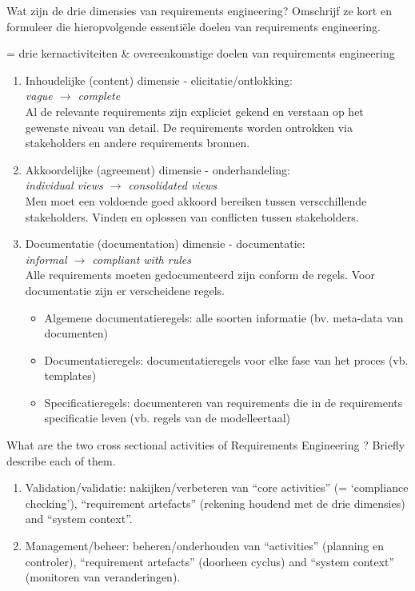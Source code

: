 \documentclass{article}
\begin{document}
\begin{quest}{}Wat zijn de drie dimensies van requirements engineering? Omschrijf ze kort en formuleer die hieropvolgende essenti\"ele doelen van requirements engineering.
\end{quest}
= drie kernactiviteiten \& overeenkomstige doelen van requirements engineering
\begin{enumerate}
    \item Inhoudelijke (content) dimensie - elicitatie/ontlokking: \\
    \textit{vague $\rightarrow$ complete}\\
    Al de relevante requirements zijn expliciet gekend en verstaan op het gewenste niveau van detail. De requirements worden ontrokken via stakeholders en andere requirements bronnen.
    \item Akkoordelijke (agreement) dimensie - onderhandeling: \\
    \textit{individual views $\rightarrow$ consolidated views}\\
    Men moet een voldoende goed akkoord bereiken tussen verscchillende stakeholders. Vinden en oplossen van conflicten tussen stakeholders.
    \item Documentatie (documentation) dimensie - documentatie: \\
    \textit{informal $\rightarrow$ compliant with rules}\\
    Alle requirements moeten gedocumenteerd zijn conform de regels.
    Voor documentatie zijn er verscheidene regels.
    \begin{itemize}
    \item Algemene documentatieregels: alle soorten informatie (bv. meta-data van documenten)
    \item Documentatieregels: documentatieregels voor elke fase van het proces (vb. templates)
    \item Specificatieregels: documenteren van requirements die in de requirements specificatie leven (vb. regels van de modelleertaal)
    \end{itemize}
\end{enumerate}

\begin{quest}{}What are the two cross sectional activities of Requirements Engineering ? Briefly describe each of them.
\end{quest}

\begin{enumerate}
	\item Validation/validatie: nakijken/verbeteren van ``core activities'' (= `compliance checking'), ``requirement artefacts'' (rekening houdend met de drie dimensies) and ``system context''.
	\item Management/beheer: beheren/onderhouden van ``activities'' (planning en controler), ``requirement artefacts'' (doorheen cyclus) and ``system context'' (monitoren van veranderingen).
\end{enumerate}
\end{document}

